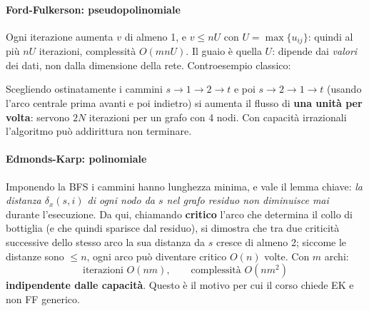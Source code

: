 \documentclass[12pt]{extarticle} %
\begin{document}
\paragraph{Ford-Fulkerson: pseudopolinomiale}
Ogni iterazione aumenta $v$ di almeno 1, e $v \le nU$ con $U = \max\{u_{ij}\}$: quindi al più $nU$ iterazioni, complessità $O(mnU)$. Il guaio è quella $U$: dipende dai \emph{valori} dei dati, non dalla dimensione della rete. Controesempio classico:
\begin{center}
\end{center}
Scegliendo ostinatamente i cammini $s\to1\to2\to t$ e poi $s\to2\to1\to t$ (usando l'arco centrale prima avanti e poi indietro) si aumenta il flusso di \textbf{una unità per volta}: servono $2N$ iterazioni per un grafo con 4 nodi. Con capacità irrazionali l'algoritmo può addirittura non terminare.

\paragraph{Edmonds-Karp: polinomiale}
Imponendo la BFS i cammini hanno lunghezza minima, e vale il lemma chiave: \emph{la distanza $\delta_x(s,i)$ di ogni nodo da $s$ nel grafo residuo non diminuisce mai} durante l'esecuzione. Da qui, chiamando \textbf{critico} l'arco che determina il collo di bottiglia (e che quindi sparisce dal residuo), si dimostra che tra due criticità successive dello stesso arco la sua distanza da $s$ cresce di almeno 2; siccome le distanze sono $\le n$, ogni arco può diventare critico $O(n)$ volte. Con $m$ archi:
\[
\text{iterazioni } O(nm), \qquad \text{complessità } O(nm^2)
\]
\textbf{indipendente dalle capacità}. Questo è il motivo per cui il corso chiede EK e non FF generico.
\end{document}
